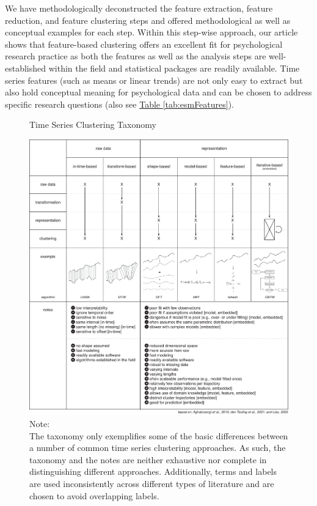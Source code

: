 \documentclass[man, 12pt, a4paper, mask, floatsintext]{apa7}
\theoremstyle{break}
\theoremstyle{plain}
\newcommand{\tblref}[2][]{\hyperref[#2]{Table \ref*{#2}#1}}
\begin{document}
We have methodologically deconstructed the feature extraction, feature reduction, and feature clustering steps and offered methodological as well as conceptual examples for each step. Within this step-wise approach, our article shows that feature-based clustering offers an excellent fit for psychological research practice as both the features as well as the analysis steps are well-established within the field and statistical packages are readily available. Time series features (such as means or linear trends) are not only easy to extract but also hold conceptual meaning for psychological data and can be chosen to address specific research questions (also see \tblref{tab:esmFeatures}). 

\begin{figure}[!hbtp] %
  \caption{Time Series Clustering Taxonomy}
  \label{fig:tsClustTax}
  \centering\includegraphics[width=\textwidth]{figures/TS Cluster Flow/tsClustTax.pdf}
  \caption*{Note: \\
  The taxonomy only exemplifies some of the basic differences between a number of common time series clustering approaches. As such, the taxonomy and the notes are neither exhaustive nor complete in distinguishing different approaches. Additionally, terms and labels are used inconsistently across different types of literature and are chosen to avoid overlapping labels.}
\end{figure}
\end{document}
